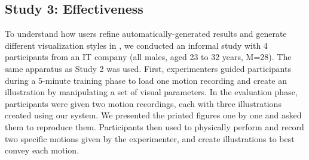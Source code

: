 
\subsection{Study 3: \phaseII{} Effectiveness}

To understand how users refine automatically-generated results and generate different visualization styles in \phaseII{}, we conducted an informal study with 4 participants from an IT company (all males, aged 23 to 32 years, M=28).
%
The same apparatus as Study 2 was used.
First, experimenters guided participants during a 5-minute training phase
 to load one motion recording and create an illustration
by manipulating a set of visual parameters. %
%
%
%
In the evaluation phase, participants were given two motion recordings, each with three illustrations created using our system. We presented the printed figures one by one and asked them to reproduce them.
%
%
Participants then used \systemname{} to physically perform and record two specific motions given by the experimenter,
and create illustrations to best convey each motion.
%

